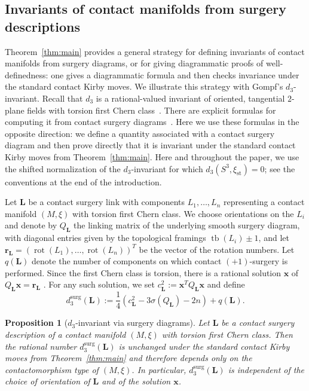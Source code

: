 \documentclass{amsart}
\numberwithin{equation}{section}
\numberwithin{figure}{section}
\newtheorem{proposition}[theorem]{Proposition}
\theoremstyle{definition}
\theoremstyle{remark}
\DeclareMathOperator{\tb}{tb}
\DeclareMathOperator{\rot}{rot}
\let\olddxi\xi %
\renewcommand{\xi}{\olddxi}
\newcommand{\xist}{\olddxi_{\mathrm{st}}}
\begin{document}

\subsection{Invariants of contact manifolds from surgery descriptions}\label{sec:invariants}

Theorem~\ref{thm:main} provides a general strategy for defining invariants of contact manifolds from surgery diagrams, or for giving diagrammatic proofs of well-definedness: one gives a diagrammatic formula and then checks invariance under the standard contact Kirby moves. We illustrate this strategy with Gompf's \(d_3\)-invariant. Recall that \(d_3\) is a rational-valued invariant of oriented, tangential \(2\)-plane fields with torsion first Chern class~\cite{Gompf}. There are explicit formulas for computing it from contact surgery diagrams~\cite{Gompf,Ding_Geiges_Stipsicz,Durst_Kegel,Etnyre_Kegel_Onaran}. Here we use these formulas in the opposite direction: we define a quantity associated with a contact surgery diagram and then prove directly that it is invariant under the standard contact Kirby moves from Theorem~\ref{thm:main}. Here and throughout the paper, we use the shifted normalization of the \(d_3\)-invariant for which \(d_3(S^3,\xist)=0\); see the conventions at the end of the introduction.

Let \(\boldsymbol L\) be a contact surgery link with components $L_1,\ldots,L_n$ representing a contact manifold $(M,\xi)$ with torsion first Chern class. We choose orientations on the $L_i$ and denote by $Q_{\boldsymbol L}$ the linking matrix of the underlying smooth surgery diagram, with diagonal entries given by the topological framings \(\tb(L_i)\pm1\), and let $\boldsymbol r_{\boldsymbol L}
=
(\rot(L_1),\ldots,\rot(L_n))^T$
be the vector of the rotation numbers. Let \(q(\boldsymbol L)\) denote the number of components on which contact \((+1)\)-surgery is performed. Since the first Chern class is torsion, there is a rational solution $\boldsymbol{x}$ of $Q_{\boldsymbol L}\boldsymbol x=\boldsymbol r_{\boldsymbol L}$ \cite{Gompf}. 
For any such solution, we set $c_{\boldsymbol L}^2
:=
\boldsymbol x^TQ_{\boldsymbol L}\boldsymbol x$ and define
\[
d_3^{\mathrm{surg}}(\boldsymbol L)
:=
\frac14\left(
c_{\boldsymbol L}^2
-3\sigma(Q_{\boldsymbol L})
-2n
\right)
+
q(\boldsymbol L).
\]

\begin{proposition}[$d_3$-invariant via surgery diagrams]\label{prop:d3-invariance}
Let $\boldsymbol{L}$ be a contact surgery description of a contact manifold $(M,\xi)$ with torsion first Chern class.  
Then the rational number $d_3^{\mathrm{surg}}(\boldsymbol L)$ is unchanged under the standard contact Kirby moves from Theorem~\ref{thm:main} and therefore depends only on the contactomorphism type of $(M,\xi)$. In particular, $d_3^{\mathrm{surg}}(\boldsymbol L)$ is independent of the choice of orientation of $\boldsymbol{L}$ and of the solution \(\boldsymbol x\). 
\end{proposition}
\end{document}
